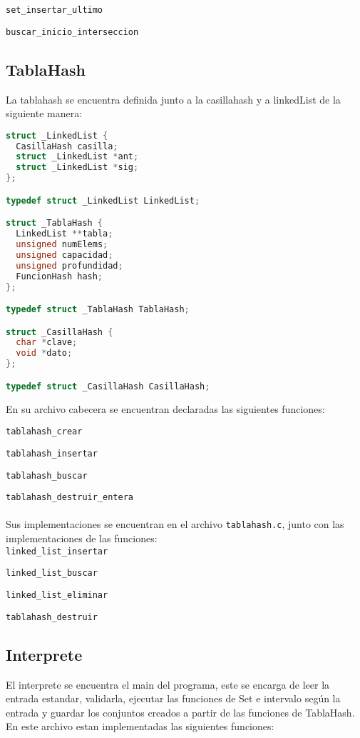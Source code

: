 \documentclass[]{article}
\begin{document}
\verb|set_insertar_ultimo|

\verb|buscar_inicio_interseccion|\\

\subsection{TablaHash}
La tablahash se encuentra definida junto a la casillahash y a linkedList de la siguiente manera:

\begin{lstlisting}[language=C]
struct _LinkedList {
  CasillaHash casilla;
  struct _LinkedList *ant;
  struct _LinkedList *sig;
};

typedef struct _LinkedList LinkedList;

struct _TablaHash {
  LinkedList **tabla;
  unsigned numElems;
  unsigned capacidad;
  unsigned profundidad;
  FuncionHash hash;
};

typedef struct _TablaHash TablaHash;

struct _CasillaHash {
  char *clave;
  void *dato;
};

typedef struct _CasillaHash CasillaHash;

\end{lstlisting}
En su archivo cabecera se encuentran declaradas las siguientes funciones:

\verb|tablahash_crear|

\verb|tablahash_insertar|

\verb|tablahash_buscar|

\verb|tablahash_destruir_entera|\\\\
Sus implementaciones se encuentran en el archivo \verb|tablahash.c|, junto con las implementaciones de las funciones:\\

\verb|linked_list_insertar|

\verb|linked_list_buscar|

\verb|linked_list_eliminar|

\verb|tablahash_destruir|\\

\subsection{Interprete}
El interprete se encuentra el main del programa, este se encarga de leer la entrada estandar, validarla, ejecutar las funciones de Set e intervalo según la entrada y guardar los conjuntos creados a partir de las funciones de TablaHash. En este archivo estan implementadas las siguientes funciones:
\end{document}
